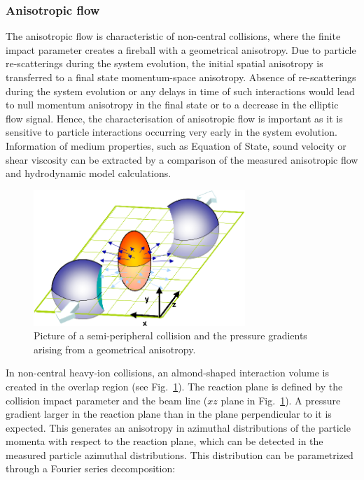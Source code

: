 \subsubsection{Anisotropic flow}
\label{sec:AnisotropicFlow}
The anisotropic flow is characteristic of non-central collisions, where the 
finite impact parameter creates a fireball with a geometrical anisotropy. 
Due to particle re-scatterings during the system evolution, the initial spatial 
anisotropy is transferred to a final state momentum-space anisotropy. Absence of
 re-scatterings during the system evolution or any delays in time of such 
 interactions would lead to null momentum anisotropy in the final state or
  to a decrease in the elliptic flow signal. Hence, the characterisation of 
  anisotropic flow is important as it is sensitive to particle interactions occurring very 
  early in the system evolution. Information of medium properties, such as Equation of 
  State, sound velocity or shear viscosity can be extracted by a comparison 
  of the measured anisotropic flow and hydrodynamic model calculations.
\begin{figure}[!ht]
  \centering
  \includegraphics[width=8cm]{FigCap1/elliptic_flow_3D_medium.png}
  \caption{Picture of a semi-peripheral collision and the pressure gradients arising from a geometrical anisotropy.}
  \label{fig:elliptic_flow_3D_medium}
\end{figure}
In non-central heavy-ion collisions, an almond-shaped interaction 
volume is created in the overlap region (see Fig.~\ref{fig:elliptic_flow_3D_medium}).
The reaction plane is defined by the collision impact parameter and the 
beam line ($xz$ plane in Fig.~\ref{fig:elliptic_flow_3D_medium}). 
A pressure gradient larger in the
 reaction plane than in the plane perpendicular to it is expected. This generates an
  anisotropy in azimuthal distributions of the particle momenta with 
  respect to the reaction plane, which can be detected in the measured
   particle azimuthal distributions. This distribution can be parametrized 
   through a Fourier series decomposition:
